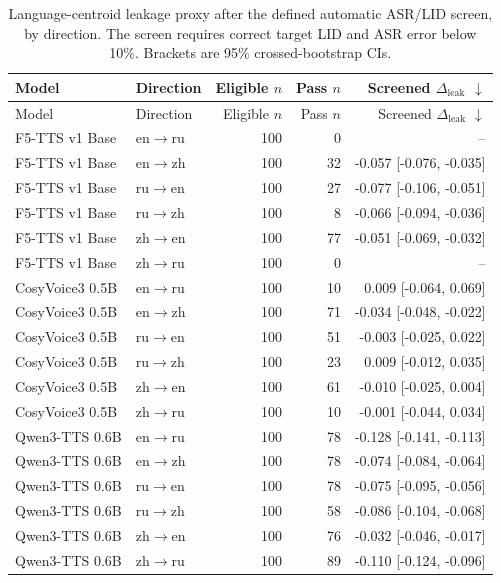 \documentclass[11pt]{article}
\newcommand{\leakdelta}{\Delta_{\mathrm{leak}}}
\begin{document}
\begin{longtable}{llrrr}
\caption{Language-centroid leakage proxy after the defined automatic ASR/LID screen, by direction. The screen requires correct target LID and ASR error below 10\%. Brackets are 95\% crossed-bootstrap CIs.}
\label{tab:successful_leakage_directions}\\
\toprule
Model & Direction & Eligible $n$ & Pass $n$ & Screened $\leakdelta$ $\downarrow$ \\
\midrule
\endfirsthead
\toprule
Model & Direction & Eligible $n$ & Pass $n$ & Screened $\leakdelta$ $\downarrow$ \\
\midrule
\endhead
F5-TTS v1 Base & en$\rightarrow$ru & 100 & 0 & -- \\
F5-TTS v1 Base & en$\rightarrow$zh & 100 & 32 & -0.057 [-0.076, -0.035] \\
F5-TTS v1 Base & ru$\rightarrow$en & 100 & 27 & -0.077 [-0.106, -0.051] \\
F5-TTS v1 Base & ru$\rightarrow$zh & 100 & 8 & -0.066 [-0.094, -0.036] \\
F5-TTS v1 Base & zh$\rightarrow$en & 100 & 77 & -0.051 [-0.069, -0.032] \\
F5-TTS v1 Base & zh$\rightarrow$ru & 100 & 0 & -- \\
CosyVoice3 0.5B & en$\rightarrow$ru & 100 & 10 & 0.009 [-0.064, 0.069] \\
CosyVoice3 0.5B & en$\rightarrow$zh & 100 & 71 & -0.034 [-0.048, -0.022] \\
CosyVoice3 0.5B & ru$\rightarrow$en & 100 & 51 & -0.003 [-0.025, 0.022] \\
CosyVoice3 0.5B & ru$\rightarrow$zh & 100 & 23 & 0.009 [-0.012, 0.035] \\
CosyVoice3 0.5B & zh$\rightarrow$en & 100 & 61 & -0.010 [-0.025, 0.004] \\
CosyVoice3 0.5B & zh$\rightarrow$ru & 100 & 10 & -0.001 [-0.044, 0.034] \\
Qwen3-TTS 0.6B & en$\rightarrow$ru & 100 & 78 & -0.128 [-0.141, -0.113] \\
Qwen3-TTS 0.6B & en$\rightarrow$zh & 100 & 78 & -0.074 [-0.084, -0.064] \\
Qwen3-TTS 0.6B & ru$\rightarrow$en & 100 & 78 & -0.075 [-0.095, -0.056] \\
Qwen3-TTS 0.6B & ru$\rightarrow$zh & 100 & 58 & -0.086 [-0.104, -0.068] \\
Qwen3-TTS 0.6B & zh$\rightarrow$en & 100 & 76 & -0.032 [-0.046, -0.017] \\
Qwen3-TTS 0.6B & zh$\rightarrow$ru & 100 & 89 & -0.110 [-0.124, -0.096] \\

\end{longtable}
\end{document}
